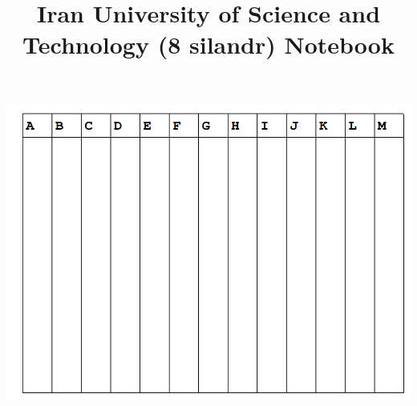 \documentclass[10pt]{article}
\title{\vspace{-4ex}\Large{Iran University of Science and Technology (8 silandr)  Notebook}}
\author{}
\date{}
\begin{document}
\begin{landscape}
\begin{multicols}{2}

\maketitle
\vspace{-13ex}
{
\baselineskip
\tableofcontents
}

\newpage  %

\begin{center}
    \includegraphics[width=1.2\textwidth]{Untitled.png}  %
\end{center}


\newpage  %

\pagestyle{fancy}



\end{multicols}
\end{landscape}
\end{document}

